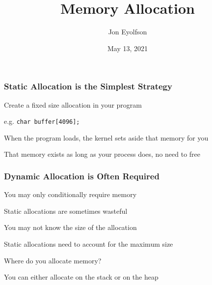 

\title{Memory Allocation}
\author{Jon Eyolfson}
\date{May 13, 2021}


  \begin{frame}
    \titlepage
  \end{frame}

  \begin{frame}
    \frametitle{Static Allocation is the Simplest Strategy}

    Create a fixed size allocation in your program

    \hspace{2em} e.g. \lstinline|char buffer[4096];|

    \vspace{2em}

    When the program loads, the kernel sets aside that memory
    for you

    \vspace{2em}

    That memory exists as long as your process does, no need to free
  \end{frame}

  \begin{frame}
    \frametitle{Dynamic Allocation is Often Required}

    You may only conditionally require memory

    \hspace{2em} Static allocations are sometimes wasteful

    \vspace{2em}

    You may not know the size of the allocation

    \hspace{2em} Static allocations need to account for the maximum size

    \vspace{2em}

    Where do you allocate memory?

    \hspace{2em} You can either allocate on the stack or on the heap
  \end{frame}

